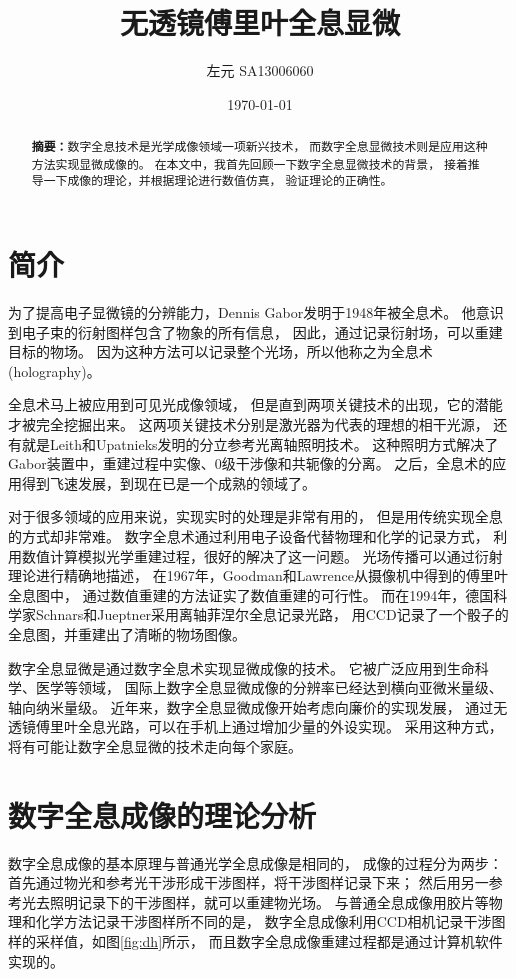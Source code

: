 \documentclass[11pt,a4paper]{article}
\title{无透镜傅里叶全息显微}
\author{左元 SA13006060}
\date{\today}
\begin{document}
\maketitle

\begin{abstract}
\noindent
\textbf{摘要：}数字全息技术是光学成像领域一项新兴技术，
而数字全息显微技术则是应用这种方法实现显微成像的。
在本文中，我首先回顾一下数字全息显微技术的背景，
接着推导一下成像的理论，并根据理论进行数值仿真，
验证理论的正确性。
\end{abstract}

\section{简介}
为了提高电子显微镜的分辨能力，Dennis Gabor发明于1948年被全息术。
他意识到电子束的衍射图样包含了物象的所有信息，
因此，通过记录衍射场，可以重建目标的物场。
因为这种方法可以记录整个光场，所以他称之为全息术(holography)\cite{gabor1948new, kim2010principles}。

全息术马上被应用到可见光成像领域，
但是直到两项关键技术的出现，它的潜能才被完全挖掘出来。
这两项关键技术分别是激光器为代表的理想的相干光源，
还有就是Leith和Upatnieks发明的分立参考光离轴照明技术\cite{leith1962reconstructed}。
这种照明方式解决了Gabor装置中，重建过程中实像、0级干涉像和共轭像的分离。
之后，全息术的应用得到飞速发展，到现在已是一个成熟的领域了。

对于很多领域的应用来说，实现实时的处理是非常有用的，
但是用传统实现全息的方式却非常难。
数字全息术通过利用电子设备代替物理和化学的记录方式，
利用数值计算模拟光学重建过程，很好的解决了这一问题。
光场传播可以通过衍射理论进行精确地描述，
在1967年，Goodman和Lawrence从摄像机中得到的傅里叶全息图中，
通过数值重建的方法证实了数值重建的可行性\cite{goodman1967digital}。
而在1994年，德国科学家Schnars和Jueptner采用离轴菲涅尔全息记录光路，
用CCD记录了一个骰子的全息图，并重建出了清晰的物场图像\cite{schnars1994direct}。

数字全息显微是通过数字全息术实现显微成像的技术。
它被广泛应用到生命科学、医学等领域，
国际上数字全息显微成像的分辨率已经达到横向亚微米量级、轴向纳米量级\cite{kemper2008digital,marquet2005digital,mann2006quantitative}。
近年来，数字全息显微成像开始考虑向廉价的实现发展，
通过无透镜傅里叶全息光路，可以在手机上通过增加少量的外设实现\cite{breslauer2009mobile,tseng2010lensfree,vashist2014cellphone}。
采用这种方式，将有可能让数字全息显微的技术走向每个家庭。

\section{数字全息成像的理论分析}
数字全息成像的基本原理与普通光学全息成像是相同的，
成像的过程分为两步：首先通过物光和参考光干涉形成干涉图样，将干涉图样记录下来；
然后用另一参考光去照明记录下的干涉图样，就可以重建物光场。
与普通全息成像用胶片等物理和化学方法记录干涉图样所不同的是，
数字全息成像利用CCD相机记录干涉图样的采样值，如图\ref{fig:dh}所示，
而且数字全息成像重建过程都是通过计算机软件实现的。
\end{document}
